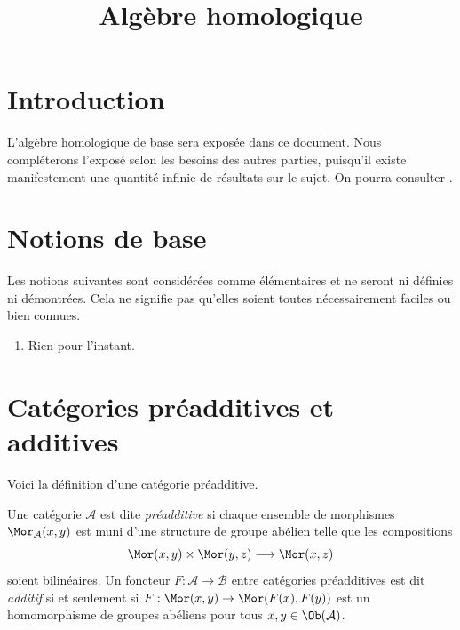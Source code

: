 

%


\title{Algèbre homologique}


\maketitle

\label{section-phantom}

\tableofcontents

\section{Introduction}
\label{section-introduction}

\noindent
L'algèbre homologique de base sera exposée dans ce document.
Nous compléterons l'exposé selon les besoins des autres parties, puisqu'il existe
manifestement une quantité infinie de résultats sur le sujet.
On pourra consulter \cite{Maclane}.

\section{Notions de base}
\label{section-topology-basic}

\noindent
Les notions suivantes sont considérées comme élémentaires et ne seront
ni définies ni démontrées. Cela ne signifie pas qu'elles soient toutes
nécessairement faciles ou bien connues.

\begin{enumerate}
\item Rien pour l'instant.
\end{enumerate}




\section{Catégories préadditives et additives}
\label{section-additive-categories}

\noindent
Voici la définition d'une catégorie préadditive.

\begin{definition}
\label{definition-preadditive}
Une catégorie $\mathcal{A}$ est dite {\it préadditive} si chaque
ensemble de morphismes $\Mor_\mathcal{A}(x, y)$ est muni
d'une structure de groupe abélien telle que les
compositions
$$
\Mor(x, y) \times \Mor(y, z)
\longrightarrow
\Mor(x, z)
$$
soient bilinéaires. Un foncteur $F : \mathcal{A} \to \mathcal{B}$ entre
catégories préadditives est dit {\it additif} si et seulement si
$F : \Mor(x, y) \to \Mor(F(x), F(y))$
est un homomorphisme de groupes abéliens pour tous
$x, y \in \Ob(\mathcal{A})$.
\end{definition}

